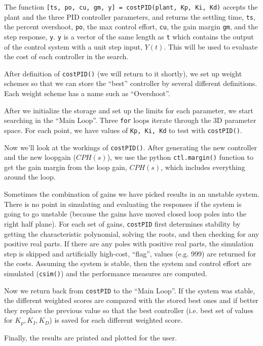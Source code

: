 The function {\tt [ts, po, cu, gm, y] = costPID(plant, Kp, Ki, Kd)} accepts the plant and the three PID controller parameters, and returns the settling time, {\tt ts},  the percent overshoot, {\tt po}, the max control effort, {\tt cu}, the gain margin {\tt gm}, and the step response, {\tt y}.   {\tt y} is a vector of the same length as {\tt t} which contains the output of the control system with a unit step input, $Y(t)$.  This will be used to evaluate the cost of  each controller in the search.

After definition of {\tt costPID()} (we will return to it shortly), we set up weight schemes so that we can store the ``best'' controller by several different definitions.  Each weight scheme has a name such as ``Overshoot''.

After we initialize the storage and set up the limits for each parameter, we start searching in the ``Main Loop''.
Three {\tt for} loops iterate through the 3D parameter space. For each point, we have values of {\tt Kp, Ki, Kd} to test with {\tt costPID()}.

Now we'll look at the workings of {\tt costPID()}.
After generating the new controller and the new loopgain ($CPH(s)$), we use the python {\tt ctl.margin()} function to get the gain margin from the loop gain, $CPH(s)$, which includes
everything around the loop.

Sometimes the combination of gains we have picked results in an unstable system.
There is no point in simulating and evaluating the responses if the system is going to go unstable (because the gains have moved closed loop poles into the right half plane).
For each set of gains, {\tt costPID}
first determines stability by getting the characteristic polynomial, solving the roots, and then checking for any positive real parts.
If there are any poles with positive real parts, the simulation step is skipped and artificially high-cost,
``flag'', values (e.g. 999) are returned for the costs.
Assuming the system is stable, then the system and control effort are simulated ({\tt csim()}) and the performance measures are computed.

Now we return back from {\tt costPID} to the ``Main Loop''.   If the system was stable, the different weighted scores are compared with the stored best ones and if better they replace the previous value so that the best controller (i.e. best set of values for $K_p, K_I, K_D$) is saved for each different weighted score.

Finally, the results are printed and plotted for the user.



